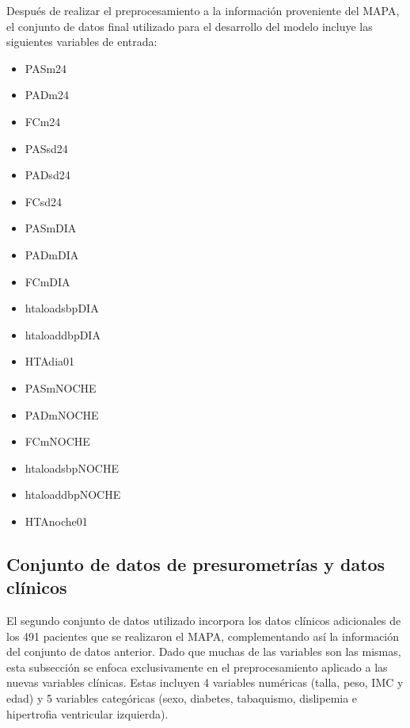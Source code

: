 Después de realizar el preprocesamiento a la información proveniente del MAPA, el conjunto 
de datos final utilizado para el desarrollo del modelo incluye las siguientes variables de entrada:

\begin{itemize}
	\item PASm24	
  \item PADm24
  \item FCm24
  \item PASsd24 
  \item PADsd24
  \item FCsd24
  \item PASmDIA
  \item PADmDIA
  \item FCmDIA
  \item htaloadsbpDIA 
  \item htaloaddbpDIA   
  \item HTAdia01	
  \item PASmNOCHE
  \item PADmNOCHE
  \item FCmNOCHE
  \item htaloadsbpNOCHE
  \item htaloaddbpNOCHE
  \item HTAnoche01
\end{itemize}


\subsection{Conjunto de datos de presurometrías y datos clínicos}
\label{sec:Conjunto2}

El segundo conjunto de datos utilizado incorpora los datos clínicos adicionales de los 491 pacientes que 
se realizaron el MAPA, complementando así la información del conjunto de datos anterior. Dado que muchas 
de las variables son las mismas, esta subsección se enfoca exclusivamente en el preprocesamiento aplicado 
a las nuevas variables clínicas. Estas incluyen 4 variables numéricas (talla, peso, IMC y edad) y 5 variables 
categóricas (sexo, diabetes, tabaquismo, dislipemia e hipertrofia ventricular izquierda).


